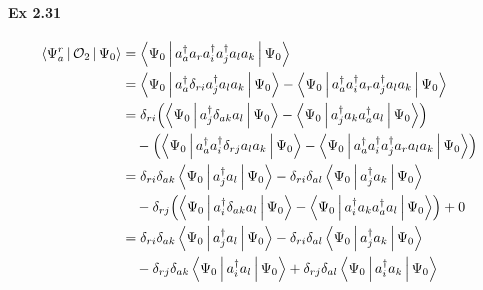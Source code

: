 \documentclass[a4paper]{article}
\newcommand{\ex}[1]{\paragraph{Ex #1}}
\numberwithin{equation}{subsection}
\begin{document}
\ex{2.31}
\begin{align}
\Braket{\Psi_a^r | \mathcal{O}_2 | \Psi_0} &= \Braket{\Psi_0 | a_a^\dagger a_r a_i^\dagger a_j^\dagger a_l a_k | \Psi_0} \notag \\
&= \Braket{\Psi_0 | a_a^\dagger \delta_{ri} a_j^\dagger a_l a_k | \Psi_0} - \Braket{\Psi_0 | a_a^\dagger a_i^\dagger a_r a_j^\dagger a_l a_k | \Psi_0} \notag\\
&= \delta_{ri} \qty(\Braket{\Psi_0 | a_j^\dagger \delta_{ak} a_l | \Psi_0}  - \Braket{\Psi_0 | a_j^\dagger a_k a_a^\dagger a_l | \Psi_0} ) \notag\\ 
  & \quad{} - \qty(\Braket{\Psi_0 | a_a^\dagger a_i^\dagger \delta_{rj} a_l a_k | \Psi_0} - \Braket{\Psi_0 | a_a^\dagger a_i^\dagger a_j^\dagger a_r a_l a_k | \Psi_0})\notag\\
&= \delta_{ri}\delta_{ak} \Braket{\Psi_0 | a_j^\dagger  a_l | \Psi_0}  - \delta_{ri}\delta_{al}\Braket{\Psi_0 | a_j^\dagger a_k | \Psi_0} \notag\\ 
  & \quad{} - \delta_{rj}\qty(\Braket{\Psi_0 | a_i^\dagger \delta_{ak} a_l| \Psi_0} - \Braket{\Psi_0 | a_i^\dagger a_k a_a^\dagger  a_l | \Psi_0} ) + 0 \notag\\
&= \delta_{ri}\delta_{ak} \Braket{\Psi_0 | a_j^\dagger  a_l | \Psi_0}  - \delta_{ri}\delta_{al}\Braket{\Psi_0 | a_j^\dagger a_k | \Psi_0} \notag\\ 
  & \quad{} - \delta_{rj}\delta_{ak} \Braket{\Psi_0 | a_i^\dagger a_l| \Psi_0} + \delta_{rj}\delta_{al} \Braket{\Psi_0 | a_i^\dagger a_k | \Psi_0}
\end{align}
\end{document}
